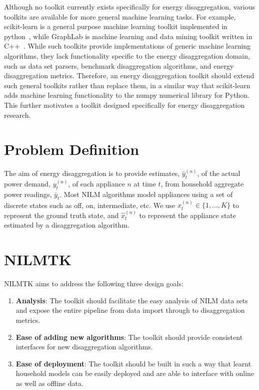 \documentclass{sig-alternate}
\begin{document}
Although no toolkit currently exists specifically for energy disaggregation, various toolkits are available for more general machine learning tasks. For example, scikit-learn is a general purpose machine learning toolkit implemented in python~\cite{scikit-learn}, while GraphLab is machine learning and data mining toolkit written in C++~\cite{graphlab}. While such toolkits provide implementations of generic machine learning algorithms, they lack functionality specific to the energy disaggregation domain, such as data set parsers, benchmark disaggregation algorithms, and energy disaggregation metrics. Therefore, an energy disaggregation toolkit should extend such general toolkits rather than replace them, in a similar way that scikit-learn adds machine learning functionality to the numpy numerical library for Python. This further motivates a toolkit designed specifically for energy disaggregation research.

\section{Problem Definition}
\label{sec:problem}

\noindent 
The aim of energy disaggregation is to provide estimates, $\hat{y}^{(n)}_t$, of the actual power demand, $y^{(n)}_t$, of each appliance $n$ at time $t$, from household aggregate power readings, $\bar{y}_t$. Most NILM algorithms model appliances using a set of discrete states such as off, on, intermediate, etc.  We use $x^{(n)}_t \in \{1, \dots, K\}$ to represent the ground truth state, and $\hat{x}^{(n)}_t$ to represent the appliance state estimated by a disaggregation algorithm.

\section{NILMTK}
\label{sec:nilmtk}

\noindent
NILMTK aims to address the following three design goals:
\begin{enumerate}
\item \textbf{Analysis}: The toolkit should facilitate the easy analysis of NILM data sets and expose the entire pipeline from data import through to disaggregation metrics. 
\item \textbf{Ease of adding new algorithms}: The toolkit should provide consistent interfaces for new disaggregation algorithms.
\item \textbf{Ease of deployment}: The toolkit should be built in such a way that learnt household models can be easily deployed and are able to interface with online as well as offline data.
\end{enumerate}
\end{document}
